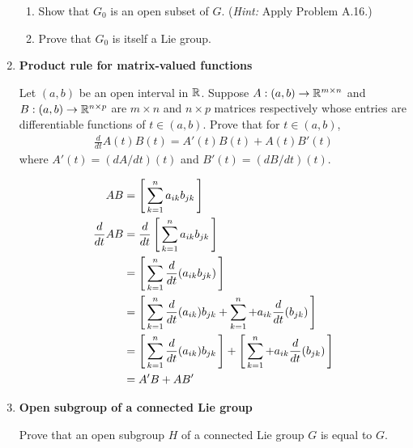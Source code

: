 \documentclass[12pt,a4paper]{report}
\newcommand{\BLUE}[1]{\textcolor{blue}{#1}}
\begin{document}
\begin{enumerate}[label=\textbf{15.\arabic*.}]
\begin{enumerate}[label=(\alph*)]
		\item Show that $G_0$ is an open subset of $G$. (\textit{Hint: }Apply Problem A.16.)
		
		\item Prove that $G_0$ is itself a Lie group.
		
	\end{enumerate}
	
	\item \textbf{Product rule for matrix-valued functions}
	
	Let $(a,b)$ be an open interval in $\mathbb{R}$.  Suppose $A : (a,b)\to\mathbb{R}^{m\times n}$ and $B:(a,b)\to\mathbb{R}^{n\times p}$ are $m\times n$ and $n\times p$ matrices respectively whose entries are differentiable functions of $t \in (a,b)$.  Prove that for $t\in(a,b)$,
	\begin{align*}
		\frac{d}{dt}A(t)B(t)=A'(t)B(t)+A(t)B'(t)
	\end{align*}where $A'(t) = (dA/dt)(t)$ and $B'(t) = (dB/dt)(t)$.
	
	\BLUE{\begin{align*}
		AB &= \left [\, \sum_{k=1}^n a_{ik}b_{jk} \,\right ] \\
		\frac{d}{dt}AB &= \frac{d}{dt}\left [\, \sum_{k=1}^n a_{ik}b_{jk} \,\right ] \\
		&= \left [\, \sum_{k=1}^n \frac{d}{dt}(a_{ik}b_{jk}) \,\right ] \\
		&= \left [\, \sum_{k=1}^n \frac{d}{dt}(a_{ik})b_{jk} + \sum_{k=1}^n + a_{ik} \frac{d}{dt}(b_{jk}) \,\right ] \\
		&= \left [\, \sum_{k=1}^n \frac{d}{dt}(a_{ik})b_{jk} \,\right ] + \left [\, \sum_{k=1}^n + a_{ik} \frac{d}{dt}(b_{jk}) \,\right ] \\
		&= A'B + AB'
	\end{align*}
	}
	
	\item \textbf{Open subgroup of a connected Lie group}
	
	Prove that an open subgroup $H$ of a connected Lie group $G$ is equal to $G$.
	

\end{enumerate}
\end{document}
